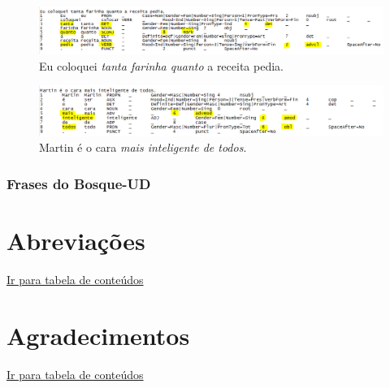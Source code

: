 \documentclass[output=paper,colorlinks,citecolor=brown]{langscibook}
\begin{document}
\begin{figure}
    \centering
    \includegraphics[width=\textwidth,height=\textheight,keepaspectratio]{imagesDrive/image20.png}
    \caption{Eu coloquei \emph{tanta farinha quanto} a receita pedia.}
    \label{fig:comparative1}
    \end{figure}{}

\begin{figure}
    \centering
    \includegraphics[width=\textwidth,height=\textheight,keepaspectratio]{imagesDrive/image27.png}
    \caption{Martin é o cara \emph{mais inteligente de todos}.}
    \label{fig:comparative2}
\end{figure}{}

\subsection{Frases do Bosque-UD}



\chapter*{Abreviações}

\hyperlink{toc}{Ir para tabela de conteúdos\\}



\chapter*{Agradecimentos}

\hyperlink{toc}{Ir para tabela de conteúdos\\}



\printbibliography[heading=subbibliography,notkeyword=this]
\end{document}
